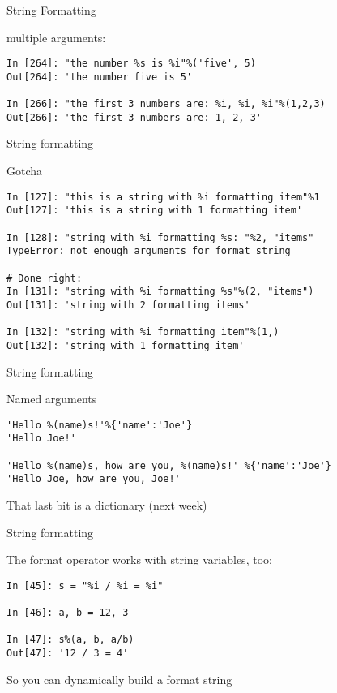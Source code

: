 \documentclass{beamer}
\begin{document}
\begin{frame}[fragile]{String Formatting}

{\Large multiple arguments:}

\begin{verbatim}
In [264]: "the number %s is %i"%('five', 5)
Out[264]: 'the number five is 5'

In [266]: "the first 3 numbers are: %i, %i, %i"%(1,2,3)
Out[266]: 'the first 3 numbers are: 1, 2, 3'

\end{verbatim}

\end{frame} 

\begin{frame}[fragile]{String formatting}

{\Large Gotcha}

\begin{verbatim}
In [127]: "this is a string with %i formatting item"%1 
Out[127]: 'this is a string with 1 formatting item'

In [128]: "string with %i formatting %s: "%2, "items" 
TypeError: not enough arguments for format string

# Done right:
In [131]: "string with %i formatting %s"%(2, "items")
Out[131]: 'string with 2 formatting items'

In [132]: "string with %i formatting item"%(1,)
Out[132]: 'string with 1 formatting item' 
\end{verbatim}

\end{frame}

\begin{frame}[fragile]{String formatting}

{\Large Named arguments}

\begin{verbatim}
'Hello %(name)s!'%{'name':'Joe'}
'Hello Joe!'

'Hello %(name)s, how are you, %(name)s!' %{'name':'Joe'}
'Hello Joe, how are you, Joe!'
\end{verbatim}
\vfill
{\Large That last bit is a dictionary (next week) }

\end{frame}

\begin{frame}[fragile]{String formatting}

{\Large The format operator works with string variables, too:}

\begin{verbatim}
In [45]: s = "%i / %i = %i"

In [46]: a, b = 12, 3

In [47]: s%(a, b, a/b)
Out[47]: '12 / 3 = 4'
\end{verbatim}
\vfill
So you can dynamically build a format string
\end{frame}
\end{document}

